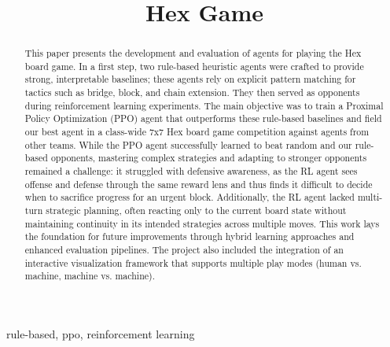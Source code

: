 \documentclass[conference]{IEEEtran}
\begin{document}
\title{Hex Game\\
}

\author{
\and
{}
}

\maketitle

\begin{abstract}
This paper presents the development and evaluation of agents for playing the Hex board game. In a first step, two rule-based heuristic agents were crafted to provide strong, interpretable baselines; these agents rely on explicit pattern matching for tactics such as bridge, block, and chain extension. They then served as opponents during reinforcement learning experiments. The main objective was to train a Proximal Policy Optimization (PPO) agent that outperforms these rule-based baselines and field our best agent in a class-wide 7x7 Hex board game competition against agents from other teams. While the PPO agent successfully learned to beat random and our rule-based opponents, mastering complex strategies and adapting to stronger opponents remained a challenge: it struggled with defensive awareness, as the RL agent sees offense and defense through the same reward lens and thus finds it difficult to decide when to sacrifice progress for an urgent block. Additionally, the RL agent lacked multi-turn strategic planning, often reacting only to the current board state without maintaining continuity in its intended strategies across multiple moves. This work lays the foundation for future improvements through hybrid learning approaches and enhanced evaluation pipelines. The project also included the integration of an interactive visualization framework that supports multiple play modes (human vs. machine, machine vs. machine). 
\end{abstract}

\begin{IEEEkeywords}
rule-based, ppo, reinforcement learning
\end{IEEEkeywords}
\end{document}
